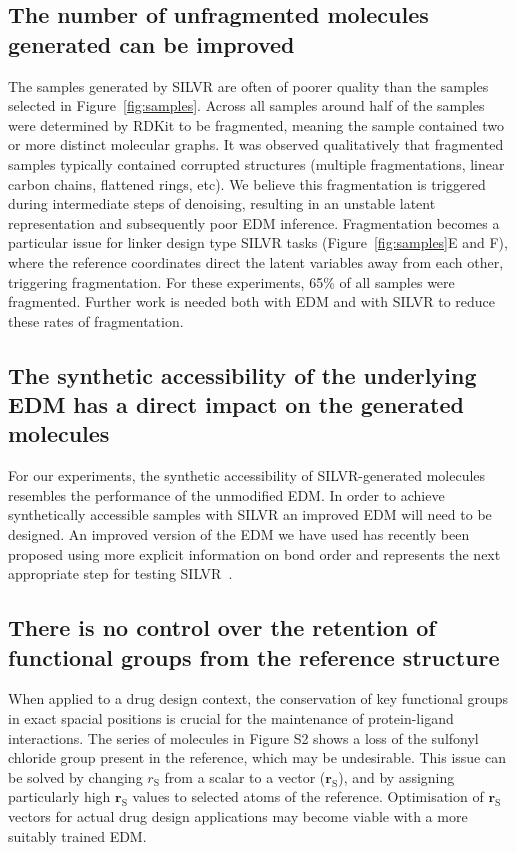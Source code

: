 \documentclass[journal=jacsat,manuscript=article]{achemso}
\begin{document}
\subsection{The number of unfragmented molecules generated can be improved}
The samples generated by SILVR are often of poorer quality than the samples selected in Figure~\ref{fig:samples}. Across all samples around half of the samples were determined by RDKit to be fragmented, meaning the sample contained two or more distinct molecular graphs. It was observed qualitatively that fragmented samples typically contained corrupted structures (multiple fragmentations, linear carbon chains, flattened rings, etc). We believe this fragmentation is triggered during intermediate steps of denoising, resulting in an unstable latent representation and subsequently poor EDM inference. Fragmentation becomes a particular issue for linker design type SILVR tasks (Figure~\ref{fig:samples}E and F), where the reference coordinates direct the latent variables away from each other, triggering fragmentation. For these experiments, 65\% of all samples were fragmented. Further work is needed both with EDM and with SILVR to reduce these rates of fragmentation. 

\subsection{The synthetic accessibility of the underlying EDM has a direct impact on the generated molecules}
 For our experiments, the synthetic accessibility of SILVR-generated molecules resembles the performance of the unmodified EDM. In order to achieve synthetically accessible samples with SILVR an improved EDM will need to be designed. An improved version of the EDM we have used has recently been proposed using more explicit information on bond order and represents the next appropriate step for testing SILVR~\cite{vignac2023midi}.

\subsection{There is no control over the retention of functional groups from the reference structure}
When applied to a drug design context, the conservation of key functional groups in exact spacial positions is crucial for the maintenance of protein-ligand interactions. The series of molecules in Figure S2 shows a loss of the sulfonyl chloride group present in the reference, which may be undesirable. This issue can be solved by changing $r_{\mathrm{S}}$ from a scalar to a vector ($\mathbf{r}_{\mathrm{S}}$), and by assigning particularly high $\mathbf{r}_{\mathrm{S}}$ values to selected atoms of the reference. Optimisation of $\mathbf{r}_{\mathrm{S}}$ vectors for actual drug design applications may become viable with a more suitably trained EDM.
\end{document}
